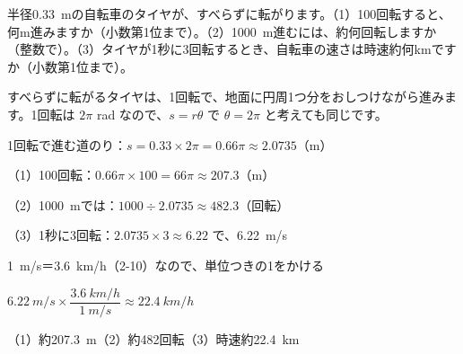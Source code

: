 \begin{reidai}[タイヤが進む道のり]
半径\qty{0.33}{m}の自転車のタイヤが、すべらずに転がります。（1）\nobreak 100回転すると、何m進みますか（小数第1位まで）。（2）\nobreak \qty{1000}{m}進むには、約何回転しますか（整数で）。（3）\nobreak タイヤが1秒に3回転するとき、自転車の速さは時速約何kmですか（小数第1位まで）。\par
\kangaekata すべらずに転がるタイヤは、1回転で、地面に円周1つ分をおしつけながら進みます。1回転は $2\pi$ rad なので、$s=r\theta$ で $\theta=2\pi$ と考えても同じです。\par
\begin{bkcenter}
\end{bkcenter}

\shiki 1回転で進む道のり：$s=0.33\times2\pi=0.66\pi\approx2.0735$（m）\par
\hspace*{2.6\zw}（1）100回転：$0.66\pi\times100=66\pi\approx207.3$（m）\par
\hspace*{2.6\zw}（2）\qty{1000}{m}では：$1000\div2.0735\approx482.3$（回転）\par
\hspace*{2.6\zw}（3）1秒に3回転：$2.0735\times3\approx6.22$ で、\qty{6.22}{m/s}\par
\hspace*{4.3\zw}\qty{1}{m/s}＝\qty{3.6}{km/h}（2-10）なので、単位つきの1をかける\par
\hspace*{4.3\zw}$\qty{6.22}{m/s}\times\dfrac{\qty{3.6}{km/h}}{\qty{1}{m/s}}\approx\qty{22.4}{km/h}$\par
\kotae （1）\nobreak 約\qty{207.3}{m}\quad（2）\nobreak 約482回転\quad（3）\nobreak 時速約\qty{22.4}{km}
\end{reidai}

